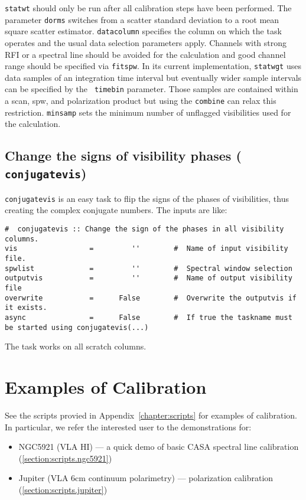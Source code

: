 {\tt statwt} should only be run after all calibration steps have been
performed. The parameter {\tt dorms} switches from a scatter standard
deviation to a root mean square scatter estimator. {\tt datacolumn}
specifies the column on which the task operates and the usual data
selection parameters apply. Channels with strong RFI or a spectral
line should be avoided for the calculation and good channel range
should be specified via {\tt fitspw}. In its current implementation,
{\tt statwgt} uses data samples of an integration time interval but
eventually wider sample intervals can be specified by the {\tt
  timebin} parameter. Those samples are contained within a scan, spw,
and polarization product but using the {\tt combine} can relax this
restriction. {\tt minsamp} sets the minimum number of unflagged
visibilities used for the calculation.


\subsection{Change the signs of visibility phases ({\tt
    conjugatevis})}
\label{section:cal.other.conjugatevis}

{\tt conjugatevis} is an easy task to flip the signs of the phases of
visibilities, thus creating the complex conjugate numbers. The inputs
are like:

\small
\begin{verbatim} 
#  conjugatevis :: Change the sign of the phases in all visibility columns.
vis                 =         ''        #  Name of input visibility file.
spwlist             =         ''        #  Spectral window selection
outputvis           =         ''        #  Name of output visibility file
overwrite           =      False        #  Overwrite the outputvis if it exists.
async               =      False        #  If true the taskname must be started using conjugatevis(...)
\end{verbatim}
\normalsize

The task works on all scratch columns. 


\section{Examples of Calibration}
\label{section:cal.examples}

See the scripts provied in Appendix~\ref{chapter:scripts} for examples of
calibration.  In particular, we refer
the interested user to the demonstrations for:
\begin{itemize}
\item NGC5921 (VLA HI) --- a quick demo of basic CASA spectral line calibration
      (\ref{section:scripts.ngc5921})
\item Jupiter (VLA 6cm continuum polarimetry) --- polarization calibration
      (\ref{section:scripts.jupiter})
\end{itemize}



